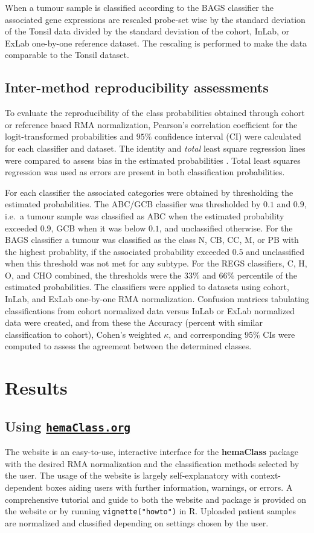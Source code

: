 \documentclass[10pt,letterpaper]{article}
\newcommand{\hemaClass}{\href{http://hemaClass.org}{\texttt{hemaClass.org}}}
\newcommand{\R}{\textsf{R}}
\newcommand{\pkg}[1]{\textbf{#1}}
\begin{document}
When a tumour sample is classified according to the BAGS classifier the associated gene expressions are rescaled probe-set wise by the standard deviation of the Tonsil data divided by the standard deviation of the cohort, InLab, or ExLab one-by-one reference dataset. The rescaling is performed to make the data comparable to the Tonsil dataset.


\subsection*{Inter-method reproducibility assessments}
To evaluate the reproducibility of the class probabilities obtained through cohort or reference based RMA normalization, Pearson's correlation coefficient for the logit-transformed probabilities and $95\%$ confidence interval (CI) were calculated for each classifier and dataset.
The identity and \emph{total} least square regression lines were compared to assess bias in the estimated probabilities \cite{CHEN1989}.
Total least squares regression was used as errors are present in both classification probabilities.

For each classifier the associated categories were obtained by thresholding the estimated probabilities.
The ABC/GCB classifier was thresholded by $0.1$ and $0.9$, i.e.\ a tumour sample was classified as ABC when the estimated probability exceeded $0.9$, GCB when it was below $0.1$, and unclassified otherwise.
For the BAGS classifier a tumour was classified as the class N, CB, CC, M, or PB with the highest probablity, if the associated probability exceeded $0.5$ and unclassified when this threshold was not met for any subtype.
For the REGS classifiers, C, H, O, and CHO combined, the thresholds were the $33\%$ and $66\%$ percentile of the estimated probabilities.
The classifiers were applied to datasets using cohort, InLab, and ExLab one-by-one RMA normalization.
Confusion matrices tabulating classifications from cohort normalized data versus InLab or ExLab normalized data were created, and from these the Accuracy (percent with similar classification to cohort), Cohen's weighted $\kappa$, and corresponding $95\%$ CIs were computed to assess the agreement between the determined classes.

\section*{Results}
\subsection*{Using \hemaClass{}}
The website is an easy-to-use, interactive interface for the \pkg{hemaClass} package with the desired RMA normalization and the classification methods selected by the user.
The usage of the website is largely self-explanatory with context-dependent boxes aiding users with further information, warnings, or errors.
A comprehensive tutorial and guide to both the website and package is provided on the website or by running \texttt{vignette("howto")} in \R{}. Uploaded patient samples are normalized and classified depending on settings chosen by the user.
\end{document}
